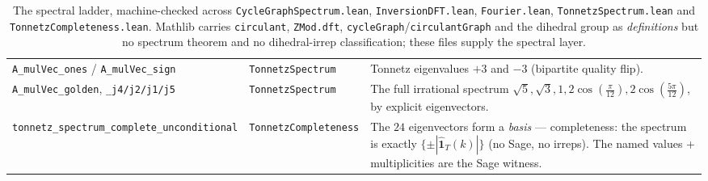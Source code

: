 \documentclass[11pt]{article}
\newcommand{\lean}[1]{\texttt{#1}}
\begin{document}
\begin{table}[!ht]
\begin{tabular}{@{}p{} p{} p{}@{}}
\lean{A\_mulVec\_ones} / \lean{A\_mulVec\_sign} & \lean{TonnetzSpectrum} & Tonnetz eigenvalues $+3$ and $-3$ (bipartite quality flip).\\
\lean{A\_mulVec\_golden}, \lean{\_j4/j2/j1/j5} & \lean{TonnetzSpectrum} & The full irrational spectrum $\sqrt5,\sqrt3,1,2\cos(\tfrac{\pi}{12}),2\cos(\tfrac{5\pi}{12})$, by explicit eigenvectors.\\
\lean{tonnetz\_spectrum\_\allowbreak complete\_\allowbreak unconditional} & \lean{TonnetzCompleteness} & The $24$ eigenvectors form a \emph{basis} --- completeness: the spectrum is exactly $\{\pm|\hat{\mathbf 1}_T(k)|\}$ (no Sage, no irreps). The named values + multiplicities are the Sage witness.\\
\bottomrule
\end{tabular}
\caption{The spectral ladder, machine-checked across \lean{CycleGraphSpectrum.lean}, \lean{InversionDFT.lean},
\lean{Fourier.lean}, \lean{TonnetzSpectrum.lean} and \lean{TonnetzCompleteness.lean}. Mathlib carries \lean{circulant}, \lean{ZMod.dft},
\lean{cycleGraph}/\lean{circulantGraph} and the dihedral group as \emph{definitions} but no spectrum theorem
and no dihedral-irrep classification; these files supply the spectral layer.}
\label{tab:lean}
\end{table}
\end{document}
